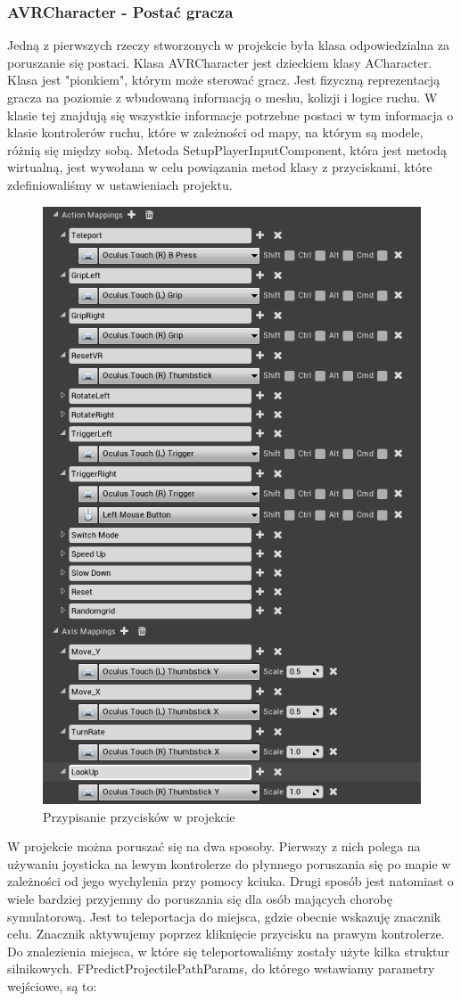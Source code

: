 \documentclass[a4paper,12pt,reqno]{article}
\begin{document}
\subsubsection{AVRCharacter - Postać gracza}

Jedną z pierwszych rzeczy stworzonych w projekcie była klasa odpowiedzialna za poruszanie się postaci. Klasa AVRCharacter jest dzieckiem klasy ACharacter. Klasa jest "pionkiem", którym może sterować gracz. Jest fizyczną reprezentacją gracza na poziomie z wbudowaną informacją o meshu, kolizji i logice ruchu. W klasie tej znajdują się wszystkie informacje potrzebne postaci w tym informacja o klasie kontrolerów ruchu, które w zależności od mapy, na którym są modele, różnią się między sobą. Metoda SetupPlayerInputComponent, która jest metodą wirtualną, jest wywołana w celu powiązania metod klasy z przyciskami, które zdefiniowaliśmy w ustawieniach projektu.




\begin{figure}[H]%
\centering
\includegraphics[width=0.4\linewidth]{graphics/05/InputMappingUE4.png}
\caption{Przypisanie przycisków w projekcie }	
\label{ref:InputMappingUE4}
\end{figure}%

W projekcie można poruszać się na dwa sposoby. Pierwszy z nich polega na używaniu 
joysticka na lewym kontrolerze do płynnego poruszania się po mapie w zależności od jego wychylenia przy pomocy kciuka. Drugi sposób jest natomiast o wiele bardziej przyjemny do poruszania się dla osób mających chorobę symulatorową. Jest to teleportacja do miejsca, gdzie obecnie wskazuję znacznik celu. Znacznik aktywujemy poprzez kliknięcie przycisku na prawym kontrolerze. Do znalezienia miejsca, w które się teleportowaliśmy zostały użyte kilka struktur silnikowych. FPredictProjectilePathParams, do którego wstawiamy parametry wejściowe, są to:
\end{document}

